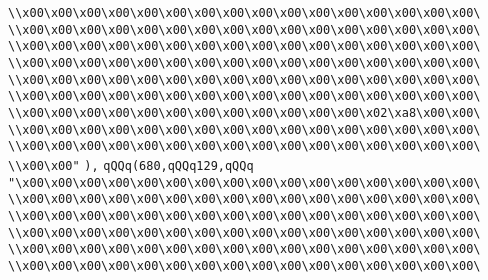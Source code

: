 \verb|\\x00\x00\x00\x00\x00\x00\x00\x00\x00\x00\x00\x00\x00\x00\x00\x00\|\newline
\verb|\\x00\x00\x00\x00\x00\x00\x00\x00\x00\x00\x00\x00\x00\x00\x00\x00\|\newline
\verb|\\x00\x00\x00\x00\x00\x00\x00\x00\x00\x00\x00\x00\x00\x00\x00\x00\|\newline
\verb|\\x00\x00\x00\x00\x00\x00\x00\x00\x00\x00\x00\x00\x00\x00\x00\x00\|\newline
\verb|\\x00\x00\x00\x00\x00\x00\x00\x00\x00\x00\x00\x00\x00\x00\x00\x00\|\newline
\verb|\\x00\x00\x00\x00\x00\x00\x00\x00\x00\x00\x00\x00\x00\x00\x00\x00\|\newline
\verb|\\x00\x00\x00\x00\x00\x00\x00\x00\x00\x00\x00\x00\x02\xa8\x00\x00\|\newline
\verb|\\x00\x00\x00\x00\x00\x00\x00\x00\x00\x00\x00\x00\x00\x00\x00\x00\|\newline
\verb|\\x00\x00\x00\x00\x00\x00\x00\x00\x00\x00\x00\x00\x00\x00\x00\x00\|\newline
\verb|\\x00\x00"|\newline
\verb|),|\newline
\verb|qQQq(680,qQQq129,qQQq|\newline
\verb|"\x00\x00\x00\x00\x00\x00\x00\x00\x00\x00\x00\x00\x00\x00\x00\x00\|\newline
\verb|\\x00\x00\x00\x00\x00\x00\x00\x00\x00\x00\x00\x00\x00\x00\x00\x00\|\newline
\verb|\\x00\x00\x00\x00\x00\x00\x00\x00\x00\x00\x00\x00\x00\x00\x00\x00\|\newline
\verb|\\x00\x00\x00\x00\x00\x00\x00\x00\x00\x00\x00\x00\x00\x00\x00\x00\|\newline
\verb|\\x00\x00\x00\x00\x00\x00\x00\x00\x00\x00\x00\x00\x00\x00\x00\x00\|\newline
\verb|\\x00\x00\x00\x00\x00\x00\x00\x00\x00\x00\x00\x00\x00\x00\x00\x00\|\newline

